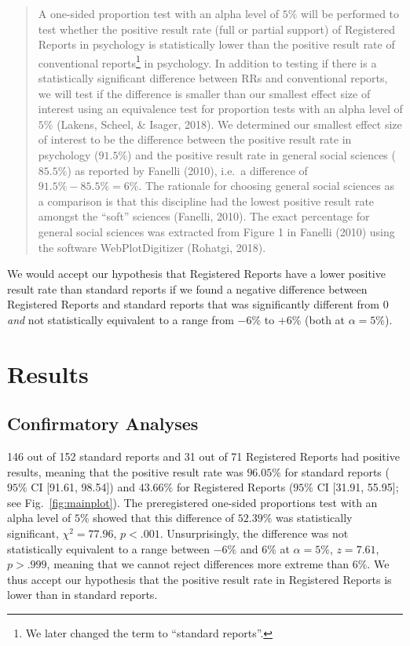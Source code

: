 \documentclass[british,,jou,floatsintext]{apa6}
\begin{document}
\begin{quote}
A one-sided proportion test with an alpha level of \(5\%\) will be performed to test whether the positive result rate (full or partial support) of Registered Reports in psychology is statistically lower than the positive result rate of conventional reports\footnote{We later changed the term to \enquote{standard reports}.} in psychology.
In addition to testing if there is a statistically significant difference between RRs and conventional reports, we will test if the difference is smaller than our smallest effect size of interest using an equivalence test for proportion tests with an alpha level of \(5\%\) (Lakens, Scheel, \& Isager, 2018).
We determined our smallest effect size of interest to be the difference between the positive result rate in psychology (\(91.5\%\)) and the positive result rate in general social sciences (\(85.5\%\)) as reported by Fanelli (2010), i.e.~a difference of \(91.5\% - 85.5\% = 6\%\).
The rationale for choosing general social sciences as a comparison is that this discipline had the lowest positive result rate amongst the \enquote{soft} sciences (Fanelli, 2010).
The exact percentage for general social sciences was extracted from Figure 1 in Fanelli (2010) using the software WebPlotDigitizer (Rohatgi, 2018).
\end{quote}

We would accept our hypothesis that Registered Reports have a lower positive result rate than standard reports if we found a negative difference between Registered Reports and standard reports that was significantly different from 0 \emph{and} not statistically equivalent to a range from \(-6\%\) to \(+6\%\) (both at \(\alpha = 5\%\)).

\hypertarget{results}{%
\section{Results}\label{results}}

\hypertarget{confirmatory-analyses}{%
\subsection{Confirmatory Analyses}\label{confirmatory-analyses}}

146 out of 152 standard reports and 31 out of 71 Registered Reports had positive results, meaning that the positive result rate was \(96.05 \%\) for standard reports (\(95 \%\) CI {[}91.61, 98.54{]}) and \(43.66 \%\) for Registered Reports (\(95 \%\) CI {[}31.91, 55.95{]}; see Fig.~\ref{fig:mainplot}).
The preregistered one-sided proportions test with an alpha level of \(5\%\) showed that this difference of \(52.39 \%\) was statistically significant, \(\chi^2 = 77.96\), \(p < .001\).
Unsurprisingly, the difference was not statistically equivalent to a range between \(-6 \%\) and \(6 \%\) at \(\alpha = 5\%\), \(z = 7.61\), \(p > .999\), meaning that we cannot reject differences more extreme than \(6\%\).
We thus accept our hypothesis that the positive result rate in Registered Reports is lower than in standard reports.
\end{document}
